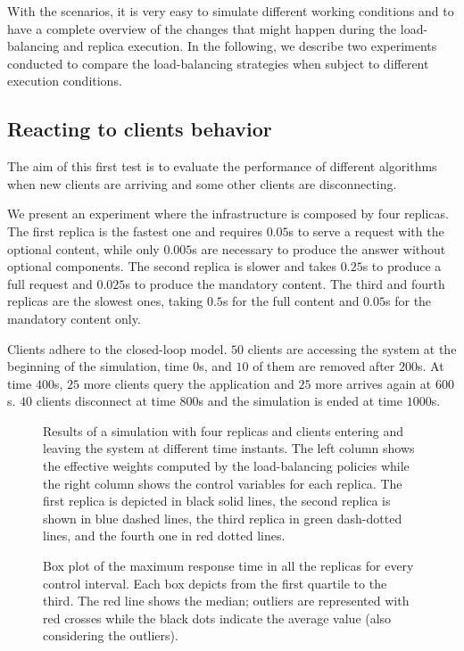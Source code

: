 With the scenarios, it is very easy to simulate different working
conditions and to have a complete overview of the changes that might
happen during the load-balancing and replica execution. In the
following, we describe two experiments conducted to compare the
load-balancing strategies when subject to different execution
conditions.

\subsection{Reacting to clients behavior}

The aim of this first test is to evaluate the performance of different
algorithms when new clients are arriving and some other clients are
disconnecting.

We present an experiment where the infrastructure is composed by four
replicas. The first replica is the fastest one and requires $0.05$s to
serve a request with the optional content, while only $0.005$s are
necessary to produce the answer without optional components. The
second replica is slower and takes $0.25$s to produce a full request
and $0.025$s to produce the mandatory content. The third and fourth
replicas are the slowest ones, taking $0.5$s for the full content and
$0.05$s for the mandatory content only.

Clients adhere to the closed-loop model. $50$ clients are accessing
the system at the beginning of the simulation, time $0$s, and $10$ of
them are removed after $200$s. At time $400$s, $25$ more clients query
the application and $25$ more arrives again at $600$s. $40$ clients
disconnect at time $800$s and the simulation is ended at time $1000$s.

\begin{figure}
  \centering 
  \caption{Results of a simulation with four replicas and clients
    entering and leaving the system at different time instants. The
    left column shows the effective weights computed by the
    load-balancing policies while the right column shows the control
    variables for each replica. The first replica is depicted in black
    solid lines, the second replica is shown in blue dashed lines, the
    third replica in green dash-dotted lines, and the fourth one in
    red dotted lines.}
\label{fig:clientchanges-full}
\end{figure}

\begin{figure}
\centering

\vspace{-4mm}
\caption{Box plot of the maximum response time in all the replicas for
  every control interval. Each box depicts from the first quartile to
  the third. The red line shows the median; outliers are represented
  with red crosses while the black dots indicate the average value
  (also considering the outliers).}
\label{fig:clientchanges-boxplot}
\end{figure}

